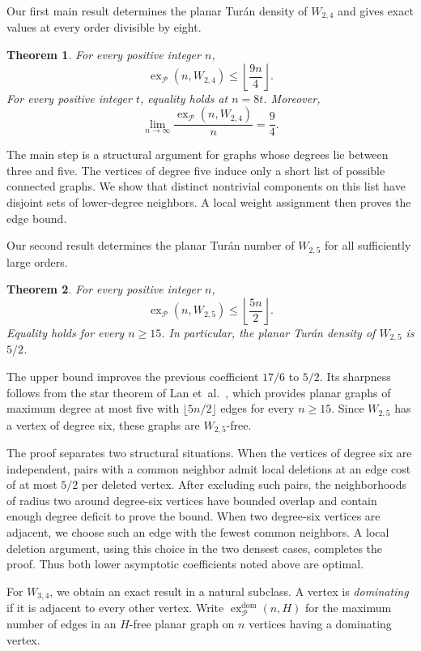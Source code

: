 \documentclass[11pt,a4paper]{article}
\newtheorem{theorem}{Theorem}[section]
\theoremstyle{remark}
\newcommand{\ex}{\operatorname{ex}}
\newcommand{\PP}{\mathcal P}
\begin{document}
Our first main result determines the planar Tur\'an density of $W_{2,4}$ and gives exact values at every order divisible by eight.

\begin{theorem}\label{thm:w24}
For every positive integer $n$,
\[
\ex_{\PP}(n,W_{2,4})\le\left\lfloor\frac{9n}{4}\right\rfloor.
\]
For every positive integer $t$, equality holds at $n=8t$. Moreover,
\[
\lim_{n\to\infty}\frac{\ex_{\PP}(n,W_{2,4})}{n}=\frac94.
\]
\end{theorem}

The main step is a structural argument for graphs whose degrees lie between three and five. The vertices of degree five induce only a short list of possible connected graphs. We show that distinct nontrivial components on this list have disjoint sets of lower-degree neighbors. A local weight assignment then proves the edge bound.

Our second result determines the planar Tur\'an number of $W_{2,5}$ for all sufficiently large orders.

\begin{theorem}\label{thm:w25}
For every positive integer $n$,
\[
\ex_{\PP}(n,W_{2,5})\le\left\lfloor\frac{5n}{2}\right\rfloor.
\]
Equality holds for every $n\ge15$. In particular, the planar Tur\'an density of $W_{2,5}$ is $5/2$.
\end{theorem}

The upper bound improves the previous coefficient $17/6$ to $5/2$. Its sharpness follows from the star theorem of Lan et~al.~\cite[Theorem~6]{LanShiSong2019}, which provides planar graphs of maximum degree at most five with $\lfloor5n/2\rfloor$ edges for every $n\ge15$. Since $W_{2,5}$ has a vertex of degree six, these graphs are $W_{2,5}$-free.

The proof separates two structural situations. When the vertices of degree six are independent, pairs with a common neighbor admit local deletions at an edge cost of at most $5/2$ per deleted vertex. After excluding such pairs, the neighborhoods of radius two around degree-six vertices have bounded overlap and contain enough degree deficit to prove the bound. When two degree-six vertices are adjacent, we choose such an edge with the fewest common neighbors. A local deletion argument, using this choice in the two densest cases, completes the proof. Thus both lower asymptotic coefficients noted above are optimal.

For $W_{3,4}$, we obtain an exact result in a natural subclass. A vertex is \emph{dominating} if it is adjacent to every other vertex. Write $\ex^{\mathrm{dom}}_{\PP}(n,H)$ for the maximum number of edges in an $H$-free planar graph on $n$ vertices having a dominating vertex.
\end{document}
